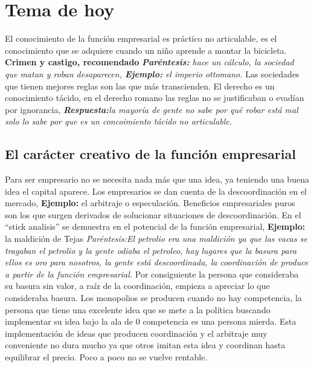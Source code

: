\section{Tema de hoy}
El conocimiento de la función empresarial es práctico no articulable, es el conocimiento que se adquiere cuando un niño aprende a montar la bicicleta. \newline 
\textbf{Crimen y castigo, recomendado} \emph{\textbf{Paréntesis:} hace un cálculo, la sociedad que matan y roban desaparecen, \textbf{Ejemplo: } el imperio ottomano.} Las sociedades que tienen mejores reglas son las que más transcienden. \newline 
El derecho es un conocimiento tácido, en el derecho romano las reglas no se justificaban o evadían por ignorancia, \emph{\textbf{Respuesta:}la mayoría de gente no sabe por qué robar está mal solo lo sabe por que es un concoimiento tácido no articulable.}

\subsection{El carácter creativo de la función empresarial}
Para ser empresario no se necesita nada más que una idea, ya teniendo una buena idea el capital aparece. Los empresarios se dan cuenta de la descoordinación en el mercado, \textbf{Ejemplo: } el arbitraje o especulación. Beneficios empresariales puros son los que surgen derivados de solucionar situaciones de descoordinación. \newline 
En el ``stick analisis'' se demuestra en el potencial de la función empresarial, \textbf{Ejemplo: } la maldición de Tejas \emph{Paréntesis:El petrolio era una maldición ya que las vacas se tragaban el petrolio y la gente odiaba el petroleo, hay lugares que la basura para ellos es oro para nosotros, la gente está descoordinada, la coordinación de produce a partir de la función empresarial.} Por consiguiente la persona que consideraba su basura sin valor, a raíz de la coordinación, empieza a apreciar lo que consideraba basura. \newline 
Los monopolios se producen cuando no hay competencia, la persona que tiene una excelente idea que se mete a la política buscando implementar su idea bajo la ala de 0 competencia es una persona mierda.
\newline 
Esta implementación de ideas que producen coordinación y el arbitraje muy conveniente no dura mucho ya que otros imitan esta idea y coordinan hasta equilibrar el precio. Poco a poco no se vuelve rentable.




